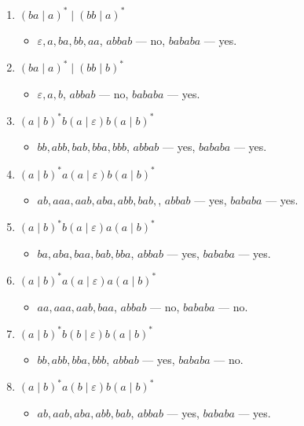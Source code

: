\documentclass[12pt]{article}
\begin{document}
\begin{enumerate}
\begin{enumerate}[label=\arabic*)]
\begin{itemize}
    \end{itemize}
    \item $(ba \mid a)^* \mid (bb \mid a)^*$
    \begin{itemize}
      \item $\varepsilon, a, ba, bb, aa$, $abbab$ --- no, $bababa$ --- yes.
    \end{itemize}
    \item $(ba \mid a)^* \mid (bb \mid b)^*$
    \begin{itemize}
      \item $\varepsilon, a, b$, $abbab$ --- no, $bababa$ --- yes.
    \end{itemize}
    \item $(a \mid b)^* b (a \mid \varepsilon) b (a \mid b)^*$
    \begin{itemize}
      \item $bb, abb, bab, bba, bbb$, $abbab$ --- yes, $bababa$ --- yes.
    \end{itemize}
    \item $(a \mid b)^* a (a \mid \varepsilon) b (a \mid b)^*$
    \begin{itemize}
      \item $ab, aaa, aab, aba, abb, bab,$, $abbab$ --- yes, $bababa$ --- yes.
    \end{itemize}
    \item $(a \mid b)^* b (a \mid \varepsilon) a (a \mid b)^*$
    \begin{itemize}
      \item $ba, aba, baa, bab, bba$, $abbab$ --- yes, $bababa$ --- yes.
    \end{itemize}
    \item $(a \mid b)^* a (a \mid \varepsilon) a (a \mid b)^*$
    \begin{itemize}
      \item $aa, aaa, aab, baa$, $abbab$ --- no, $bababa$ --- no.
    \end{itemize}
    \item $(a \mid b)^* b (b \mid \varepsilon) b (a \mid b)^*$
    \begin{itemize}
      \item $bb, abb, bba, bbb$, $abbab$ --- yes, $bababa$ --- no.
    \end{itemize}
    \item $(a \mid b)^* a (b \mid \varepsilon) b (a \mid b)^*$
    \begin{itemize}
      \item $ab, aab, aba, abb, bab$, $abbab$ --- yes, $bababa$ --- yes.

\end{itemize}
\end{enumerate}
\end{enumerate}
\end{document}
